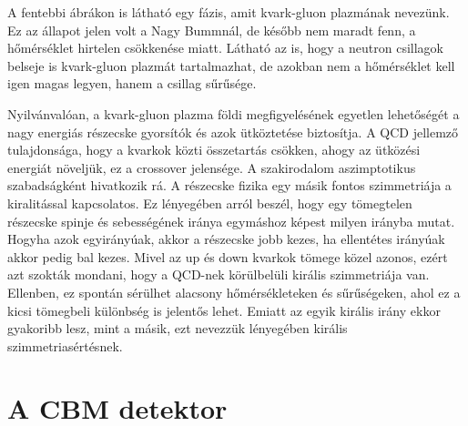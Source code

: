 \documentclass[a4paper,12pt]{article}
\begin{document}
\par A fentebbi ábrákon is látható egy fázis, amit kvark-gluon plazmának nevezünk. Ez az állapot jelen volt a Nagy Bummnál, de később
nem maradt fenn, a hőmérséklet hirtelen csökkenése miatt. Látható az is, hogy a neutron csillagok belseje is kvark-gluon plazmát tartalmazhat,
de azokban nem a hőmérséklet kell igen magas legyen, hanem a csillag sűrűsége. 
\vspace{5mm}
\par Nyilvánvalóan, a kvark-gluon plazma földi megfigyelésének egyetlen lehetőségét a nagy energiás részecske gyorsítók és azok
ütköztetése biztosítja. A QCD jellemző tulajdonsága, hogy a kvarkok közti összetartás csökken, ahogy az ütközési energiát
növeljük, ez a crossover jelensége. A szakirodalom aszimptotikus szabadságként hivatkozik rá. A részecske fizika egy másik fontos
szimmetriája a kiralitással kapcsolatos. Ez lényegében arról beszél, hogy egy tömegtelen részecske spinje és sebességének iránya egymáshoz 
képest milyen irányba mutat. Hogyha azok egyirányúak, akkor a részecske jobb kezes, ha ellentétes irányúak akkor pedig bal kezes. Mivel
az up és down kvarkok tömege közel azonos, ezért azt szokták mondani, hogy a QCD-nek körülbelüli királis szimmetriája van. Ellenben, ez spontán
sérülhet alacsony hőmérsékleteken és sűrűségeken, ahol ez a kicsi tömegbeli különbség is jelentős lehet. Emiatt az egyik királis irány ekkor 
gyakoribb lesz, mint a másik, ezt nevezzük lényegében királis szimmetriasértésnek. 
\section{ A CBM detektor}
\end{document}
